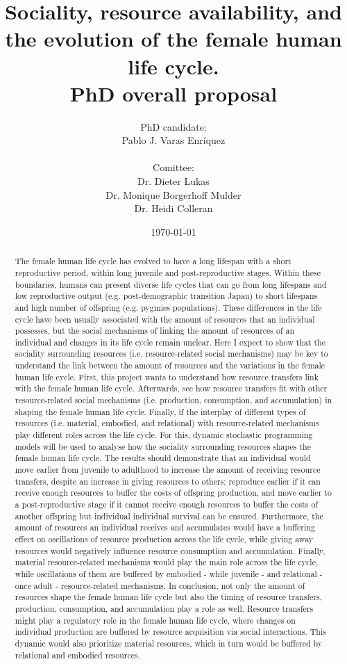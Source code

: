 \documentclass{article}
\title{
Sociality, resource availability, and the evolution of the female human life cycle.\\
PhD overall proposal}
\author{PhD candidate:\\
Pablo J. Varas Enríquez\\\\
Comittee:\\
Dr. Dieter Lukas\\
Dr. Monique Borgerhoff Mulder\\
Dr. Heidi Colleran}
\date{\today}
\begin{document}
\maketitle

\tableofcontents

\begin{abstract}
    The female human life cycle has evolved to have a long lifespan with a short reproductive period, within long juvenile and post-reproductive stages. Within these boundaries, humans can present diverse life cycles that can go from long lifespans and low reproductive output (e.g. post-demographic transition Japan) to short lifespans and high number of offspring (e.g. pygmies populations). These differences in the life cycle have been usually associated with the amount of resources that an individual possesses, but the social mechanisms of linking the amount of resources of an individual and changes in its life cycle remain unclear. Here I expect to show that the sociality surrounding resources (i.e. resource-related social mechanisms) may be key to understand the link between the amount of resources and the variations in the female human life cycle. First, this project wants to understand how resource transfers link with the female human life cycle. Afterwards, see how resource transfers fit with other resource-related social mechanisms (i.e. production, consumption, and accumulation) in shaping the female human life cycle. Finally, if the interplay of different types of resources (i.e. material, embodied, and relational) with resource-related mechanisms play different roles across the life cycle. For this, dynamic stochastic programming models will be used to analyse how the sociality surrounding resources shapes the female human life cycle. The results should demonstrate that an individual would move earlier from juvenile to adulthood to increase the amount of receiving resource transfers, despite an increase in giving resources to others; reproduce earlier if it can receive enough resources to buffer the costs of offspring production, and move earlier to a post-reproductive stage if it cannot receive enough resources to buffer the costs of another offspring but individual individual survival can be ensured. Furthermore, the amount of resources an individual receives and accumulates would have a buffering effect on oscillations of resource production across the life cycle, while giving away resources would negatively influence resource consumption and accumulation. Finally, material resource-related mechanisms would play the main role across the life cycle, while oscillations of them are buffered by embodied - while juvenile - and relational - once adult - resource-related mechanisms. In conclusion, not only the amount of resources shape the female human life cycle but also the timing of resource transfers, production, consumption, and accumulation play a role as well. Resource transfers might play a regulatory role in the female human life cycle, where changes on individual production are buffered by resource acquisition via social interactions. This dynamic would also prioritize material resources, which in turn would be buffered by relational and embodied resources.
\end{abstract}
\end{document}
